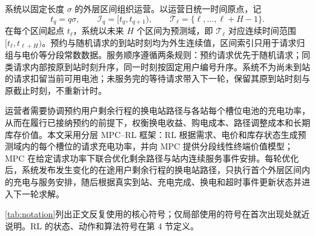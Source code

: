 \documentclass[12pt,a4paper,UTF8]{ctexart}
\begin{document}
系统以固定长度 $\sigma$ 的外层区间组织运营。以运营日统一时间原点，记
\[
t_q=q\sigma,
\qquad
\mathcal I_q=[t_q,t_{q+1}),
\qquad
\mathcal T_\ell=\{\ell,\ldots,\ell+H-1\}.
\]
在每个区间起点 $t_\ell$，系统以未来 $H$ 个区间为预测域，即 $\mathcal T_\ell$ 对应连续时间范围 $[t_\ell,t_{\ell+H})$。预约与随机请求的到站时刻均为外生连续值，区间索引只用于请求归组与电价等分段常数数据。服务顺序遵循两条规则：预约请求优先于随机请求；同类请求内部按原到站时刻升序，同一时刻按固定用户编号升序。系统不为尚未到站的请求扣留当前可用电池；未服务完的等待请求带入下一轮，保留其原到站时刻与原截止时刻，不重新计时。

运营者需要协调预约用户剩余行程的换电站路径与各站每个槽位电池的充电功率，从而在履行已接纳预约的前提下，权衡换电收益、购电成本、路径调整成本和长期库存价值。本文采用分层 MPC--RL 框架：RL 根据需求、电价和库存状态生成预测域内的每个槽位的请求充电功率，并向 MPC 提供分段线性终端价值模型；MPC 在给定请求功率下联合优化剩余路径与站内连续服务事件安排。每轮优化后，系统发布发生变化的在途用户剩余行程的换电站路径，只执行首个外层区间内的充电与服务安排，随后根据真实到站、充电完成、换电和超时事件更新状态并进入下一轮求解。

\autoref{tab:notation}列出正文反复使用的核心符号；仅局部使用的符号在首次出现处就近说明。RL 的状态、动作和算法符号在第 4 节定义。
\end{document}
